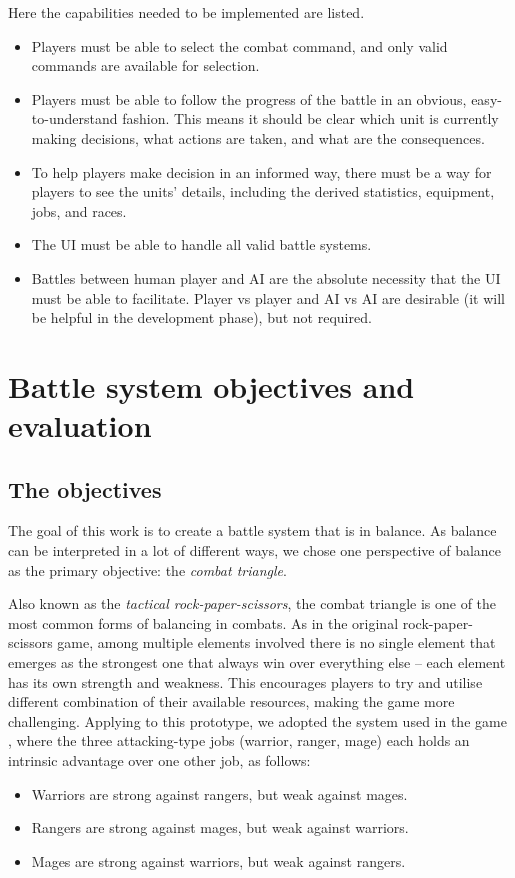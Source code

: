 Here the capabilities needed to be implemented are listed.
\begin{itemize}
	\item Players must be able to select the combat command, and only valid commands are available for selection.
	\item Players must be able to follow the progress of the battle in an obvious, easy-to-understand fashion. This means it should be clear which unit is currently making decisions, what actions are taken, and what are the consequences.
	\item To help players make decision in an informed way, there must be a way for players to see the units' details, including the derived statistics, equipment, jobs, and races.
	\item The UI must be able to handle all valid battle systems.
	\item Battles between human player and AI are the absolute necessity that the UI must be able to facilitate. Player vs player and AI vs AI are desirable (it will be helpful in the development phase), but not required.
\end{itemize}

\section{Battle system objectives and evaluation}

\subsection{The objectives}
\label{sub:battleobjectives}

The goal of this work is to create a battle system that is in balance. As balance can be interpreted in a lot of different ways, we chose one perspective of balance as the primary objective: the \textit{combat triangle}.

Also known as the \textit{tactical rock-paper-scissors}, the combat triangle is one of the most common forms of balancing in combats.\cite[87]{moore2011basics} As in the original rock-paper-scissors game, among multiple elements involved there is no single element that emerges as the strongest one that always win over everything else -- each element has its own strength and weakness. This encourages players to try and utilise different combination of their available resources, making the game more challenging. Applying to this prototype, we adopted the system used in the game , where the three attacking-type jobs (warrior, ranger, mage) each holds an intrinsic advantage over one other job, as follows:\cite{wiki-runescapecombat}
\begin{itemize}
	\item Warriors are strong against rangers, but weak against mages.
	\item Rangers are strong against mages, but weak against warriors.
	\item Mages are strong against warriors, but weak against rangers.
\end{itemize}

